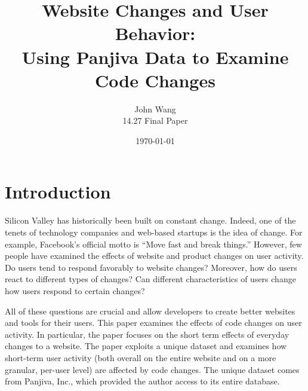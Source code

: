\documentclass[12pt]{article}
\title{Website Changes and User Behavior: \\
Using Panjiva Data to Examine Code Changes}
\date{\today}
\author{John Wang \\
14.27 Final Paper}
\begin{document}
\maketitle


\tableofcontents

\newpage

\section{Introduction}

Silicon Valley has historically been built on constant change. Indeed, one of the tenets of technology companies and web-based startups is the idea of change. For example, Facebook's official motto is ``Move fast and break things.''  However, few people have examined the effects of website and product changes on user activity. Do users tend to respond favorably to website changes? Moreover, how do users react to different types of changes? Can different characteristics of users change how users respond to certain changes?

All of these questions are crucial and allow developers to create better websites and tools for their users. This paper examines the effects of code changes on user activity. In particular, the paper focuses on the short term effects of everyday changes to a website. The paper exploits a unique dataset and examines how short-term user activity (both overall on the entire website and on a more granular, per-user level) are affected by code changes. The unique dataset comes from Panjiva, Inc., which provided the author access to its entire database.
\end{document}
